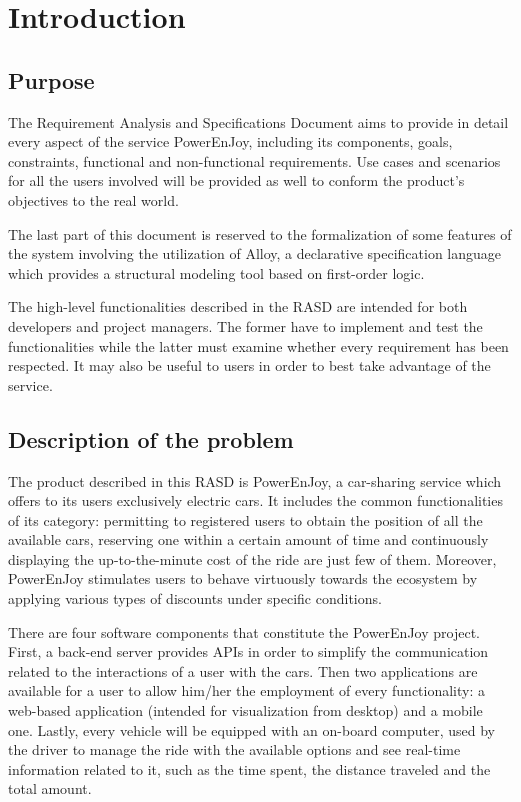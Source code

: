 \chapter{Introduction}

\section{Purpose}
The Requirement Analysis and Specifications Document aims to provide in detail every aspect of the service PowerEnJoy, including its components, goals, constraints, functional and non-functional requirements. Use cases and scenarios for all the users involved will be provided as well to conform the product's objectives to the real world.

The last part of this document is reserved to the formalization of some features of the system involving the utilization of Alloy, a declarative specification language which provides a structural modeling tool based on first-order logic.

The high-level functionalities described in the RASD are intended for both developers and project managers. The former have to implement and test the functionalities while the latter must examine whether every requirement has been respected. It may also be useful to users in order to best take advantage of the service.

\section{Description of the problem}
The product described in this RASD is PowerEnJoy, a car-sharing service which offers to its users exclusively electric cars. It includes the common functionalities of its category: permitting to registered users to obtain the position of all the available cars, reserving one within a certain amount of time and continuously displaying the up-to-the-minute cost of the ride are just few of them. Moreover, PowerEnJoy stimulates users to behave virtuously towards the ecosystem by applying various types of discounts under specific conditions.

There are four software components that constitute the PowerEnJoy project. First, a back-end server provides APIs in order to simplify the communication related to the interactions of a user with the cars. Then two applications are available for a user to allow him/her the employment of every functionality: a web-based application (intended for visualization from desktop) and a mobile one. Lastly, every vehicle will be equipped with an on-board computer, used by the driver to manage the ride with the available options and see real-time information related to it, such as the time spent, the distance traveled and the total amount.

